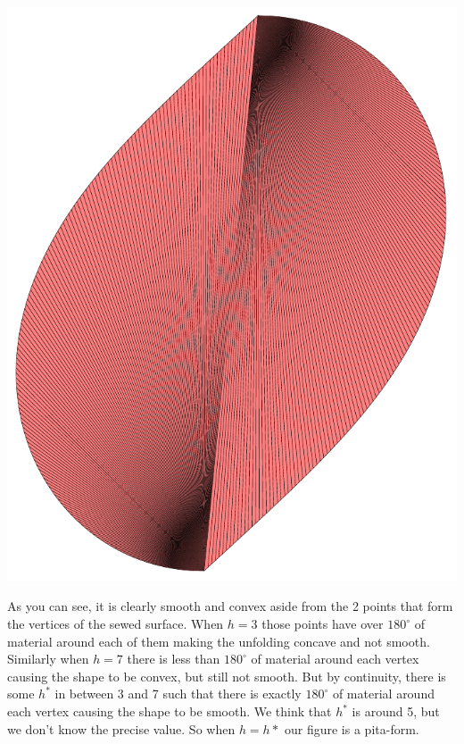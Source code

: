\documentclass[12pt]{article}
\begin{document}
\begin{center}
\includegraphics[scale=.4]{unfold_h=7_n=150.pdf}
\end{center}

As you can see, it is clearly smooth and convex aside from the 2 points that form the vertices of the sewed surface. When $h=3$ those points have over $180^\circ$ of material around each of them making the unfolding concave and not smooth. Similarly when $h=7$ there is less than $180^\circ$ of material around each vertex causing the shape to be convex, but still not smooth. But by continuity, there is some $h^*$ in between 3 and 7 such that there is exactly $180^\circ$ of material around each vertex causing the shape to be smooth. We think that $h^*$ is around 5, but we don't know the precise value. So when $h=h*$ our figure is a pita-form.
\end{document}
